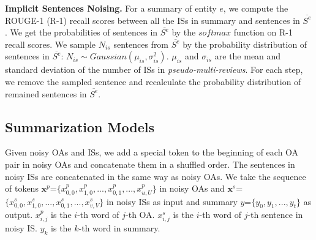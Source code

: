 {{\textbf{Implicit Sentences Noising.}
For a summary of entity $e$, 
we compute the ROUGE-1 (R-1) recall scores between all the ISs in summary
and sentences in $\overline{S^e}$.
We get the probabilities of sentences in $\overline{S^e}$
by the $softmax$ function on R-1 recall scores. 
We sample $N_{is}$ sentences from $\overline{S^e}$ by
the probability distribution of sentences in $\overline{S^e}$:
$N_{is} \sim Gaussian(\mu_{is}, \sigma_{is}^2)$.
$\mu_{is}$ and $\sigma_{is}$ are the mean and standard deviation of 
the number of ISs in {\em pseudo-multi-reviews}.
For each step, we remove the sampled sentence and recalculate the probability distribution of remained sentences in $\overline{S^e}$.

\subsection{Summarization Models}
\label{sec:model}
Given noisy OAs and ISs,
we add a special token to the beginning of 
each OA pair in noisy OAs and concatenate them in a shuffled order. 
The sentences in noisy ISs are concatenated in the same way as noisy OAs. 
We take the sequence of tokens  $\textbf{x}^p$=$\{x^p_{0,0},x^p_{1,0},...,x^p_{0,1},...,x^p_{u,U}\}$ in noisy OAs
and $\textbf{x}^s$=$\{x^s_{0,0},x^s_{1,0},...,x^s_{0,1},...,x^s_{v,V}\}$ in noisy ISs
as input and summary $y$=$\{y_0, y_1,..., y_t\}$ as output.
$x^p_{i,j}$ is the $i$-th word of $j$-th OA.
$x^s_{i,j}$ is the $i$-th word of $j$-th sentence in noisy IS.
$y_k$ is the $k$-th word in summary.
%


}}
